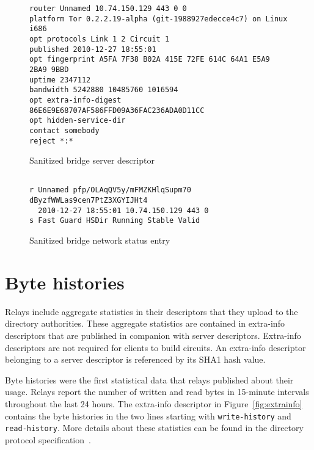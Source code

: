 \documentclass{article}
\begin{document}
\begin{figure}
\begin{verbatim}
router Unnamed 10.74.150.129 443 0 0
platform Tor 0.2.2.19-alpha (git-1988927edecce4c7) on Linux i686
opt protocols Link 1 2 Circuit 1
published 2010-12-27 18:55:01
opt fingerprint A5FA 7F38 B02A 415E 72FE 614C 64A1 E5A9 2BA9 9BBD
uptime 2347112
bandwidth 5242880 10485760 1016594
opt extra-info-digest 86E6E9E68707AF586FFD09A36FAC236ADA0D11CC
opt hidden-service-dir
contact somebody
reject *:*
\end{verbatim}
\vspace{-1em}
\caption{Sanitized bridge server descriptor}
\label{fig:bridgeserverdesc}
\end{figure}

\begin{figure}
\begin{verbatim}

r Unnamed pfp/OLAqQV5y/mFMZKHlqSupm70 dByzfWWLas9cen7PtZ3XGYIJHt4
  2010-12-27 18:55:01 10.74.150.129 443 0
s Fast Guard HSDir Running Stable Valid
\end{verbatim}
\vspace{-1em}
\caption{Sanitized bridge network status entry}
\label{fig:bridgestatusentry}
\end{figure}

\section{Byte histories}
\label{sec:bytehist}

Relays include aggregate statistics in their descriptors that they upload
to the directory authorities.
These aggregate statistics are contained in extra-info descriptors that
are published in companion with server descriptors.
Extra-info descriptors are not required for clients to build circuits.
An extra-info descriptor belonging to a server descriptor is referenced by
its SHA1 hash value.

Byte histories were the first statistical data that relays published about
their usage.
Relays report the number of written and read bytes in 15-minute intervals
throughout the last 24 hours.
The extra-info descriptor in Figure~\ref{fig:extrainfo} contains the byte
histories in the two lines starting with \verb+write-history+ and
\verb+read-history+.
More details about these statistics can be found in the directory protocol
specification~\cite{dirspec}.
\end{document}
